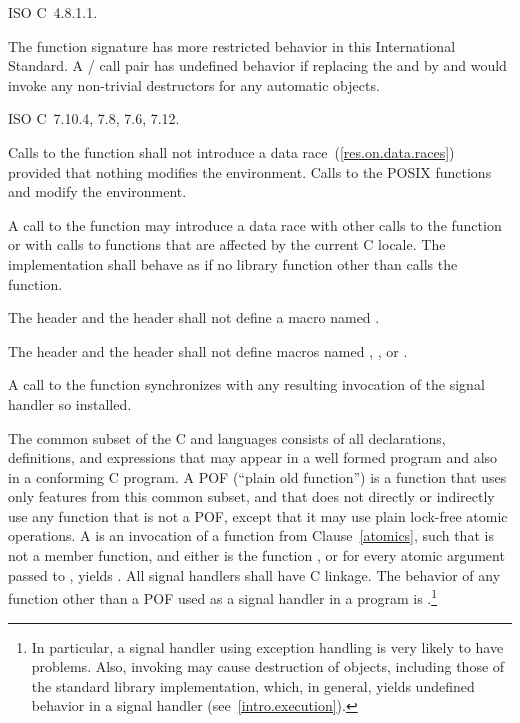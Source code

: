 \xref ISO C~4.8.1.1.

\pnum
The function signature
%
has more restricted behavior in this International Standard.
A / call pair has undefined
behavior if replacing the  and 
by  and  would invoke any non-trivial destructors for any automatic
objects.

\xref ISO C~7.10.4, 7.8, 7.6, 7.12.

\pnum
Calls to the function
%
 shall not introduce a data
race~(\ref{res.on.data.races}) provided that nothing modifies the environment.
\enternote Calls to the POSIX functions
%
 and
%
 modify the
environment. \exitnote

\pnum
A call to the  function may introduce a data race with other
calls to the  function or with calls to functions that are
affected by the current C locale. The implementation shall behave as if no
library function other than  calls the 
function.

\pnum
{}%
%
The header  and the header  shall not
define a macro named .

\pnum
{}%
%
The header  and the header  shall not
define macros named , , or .

\pnum
A call to the function  synchronizes with any resulting
invocation of the signal handler so installed.

\pnum
The common subset of the C and \Cpp languages consists of all declarations,
definitions, and expressions that may appear in a well formed \Cpp program
and also in a conforming C program.
A
%
%
POF (``plain old function'') is a function that uses only features from
this common subset, and that does not directly or indirectly use any
function that is not a POF, except that it may use
plain lock-free atomic operations.
A  is an invocation of a function
 from Clause~\ref{atomics}, such that  is not a
member function, and either  is the function
, or for every atomic argument  passed to
,  yields .
All signal handlers shall have C linkage.
The behavior of any function other than a POF used as a signal handler in a
\Cpp program is .\footnote{In
particular, a signal handler using exception handling is very likely to
have problems. Also, invoking  may cause destruction of objects,
including those of the standard library implementation, which, in general, yields
undefined behavior in a signal handler (see~\ref{intro.execution}).}

